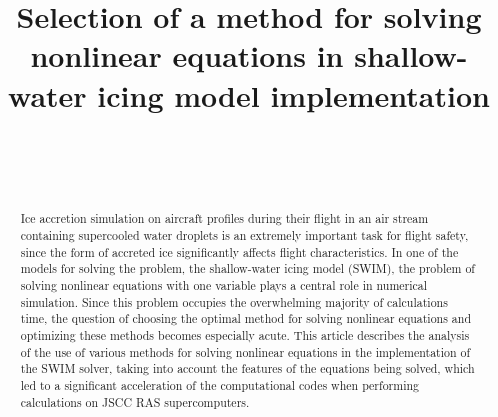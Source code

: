 \documentclass[
11pt,%
tightenlines,%
twoside,%
onecolumn,%
nofloats,%
nobibnotes,%
nofootinbib,%
superscriptaddress,%
noshowpacs,%
centertags]%
{revtex4}
\begin{document}

\title{Selection of a method for solving nonlinear equations in shallow-water icing model implementation}

\author{~}

\author{~}



\begin{abstract}
Ice accretion simulation on aircraft profiles during their flight in an air stream containing supercooled water droplets is an extremely important task for flight safety, since the form of accreted ice significantly affects flight characteristics.
In one of the models for solving the problem, the shallow-water icing model (SWIM), the problem of solving nonlinear equations with one variable plays a central role in numerical simulation.
Since this problem occupies the overwhelming majority of calculations time, the question of choosing the optimal method for solving nonlinear equations and optimizing these methods becomes especially acute.
This article describes the analysis of the use of various methods for solving nonlinear equations in the implementation of the SWIM solver, taking into account the features of the equations being solved, which led to a significant acceleration of the computational codes when performing calculations on JSCC RAS supercomputers.
\end{abstract}



\maketitle
\end{document}

